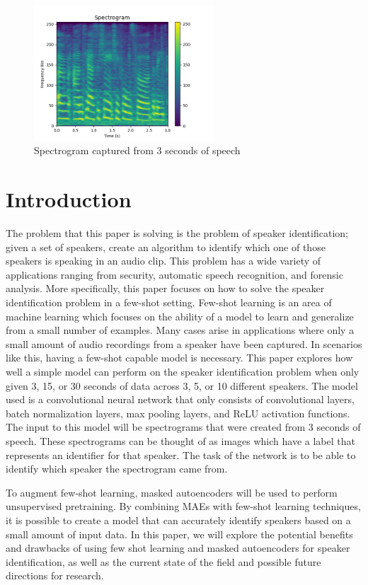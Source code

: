 \documentclass{article}
\begin{document}
\begin{figure}
  \centering
  \includegraphics[width=0.6\textwidth]{Images/spectrogram_example.png}
  \caption{Spectrogram captured from 3 seconds of speech}
  \label{fig:SpectrogramExample}
\end{figure}

\section{Introduction}
The problem that this paper is solving is the problem of speaker identification; given a set of speakers, create an
algorithm to identify which one of those speakers is speaking in an audio clip. This problem has a wide variety of 
applications ranging from security, automatic speech recognition, and forensic analysis. More specifically, this paper focuses
on how to solve the speaker identification problem in a few-shot setting. Few-shot learning is an area of machine learning
which focuses on the ability of a model to learn and generalize from a small number of examples. Many cases arise in applications
where only a small amount of audio recordings from a speaker have been captured. In scenarios like this, having a few-shot
capable model is necessary. This paper explores how well a simple model can perform on the speaker identification problem when only given 3, 15, or
30 seconds of data across 3, 5, or 10 different speakers. The model used is a convolutional neural network that only
consists of convolutional layers, batch normalization layers, max pooling layers, and ReLU activation functions. The input
to this model will be spectrograms that were created from 3 seconds of speech. These spectrograms can be thought of as images
which have a label that represents an identifier for that speaker. The task of the network is to be able to identify which
speaker the spectrogram came from.

To augment few-shot learning, masked autoencoders will be used to perform unsupervised pretraining. By combining MAEs with
few-shot learning techniques, it is possible to create a model that can accurately identify speakers based on a small 
amount of input data. In this paper, we will explore the potential benefits and drawbacks of using few shot learning and
masked autoencoders for speaker identification, as well as the current state of the field and possible future directions
for research.
\end{document}
